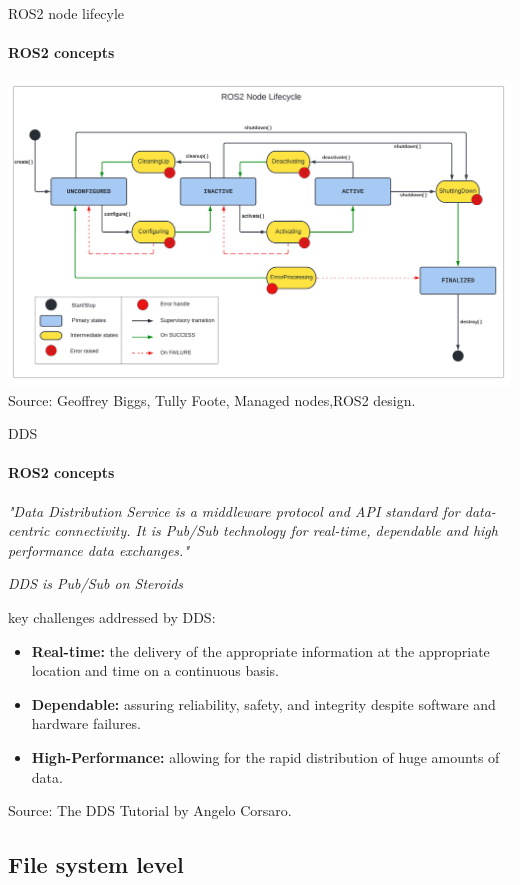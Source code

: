 \documentclass{beamer}
\begin{document}
\begin{frame}{ROS2 node lifecyle}
    \framesubtitle{ROS2 concepts}
      \centering
    \includegraphics[width=1
    \linewidth]{figures/ROS2_lifecycle.png}
    \tiny{Source: Geoffrey Biggs, Tully Foote, Managed nodes,ROS2 design.}
\end{frame}

\begin{frame}{DDS}
  \framesubtitle{ROS2 concepts}
  \textit{"Data Distribution Service is a middleware protocol and API standard for data-centric connectivity. It is Pub/Sub technology for real-time, dependable and high performance data exchanges."}
  
  \begin{center}
    \textit{DDS is Pub/Sub on Steroids}
  \end{center}
  
  key challenges addressed by DDS:
    \begin{itemize}
        \item \textbf{Real-time:} the delivery of the appropriate information at the appropriate location and time on a continuous basis.
        \item \textbf{Dependable:} assuring reliability, safety, and integrity despite software and hardware failures.
        \item \textbf{High-Performance:} allowing for the rapid distribution of huge amounts of data.

    \end{itemize}

\tiny{Source: The DDS Tutorial by Angelo Corsaro. }
\end{frame}

\subsection{File system level}
\end{document}
